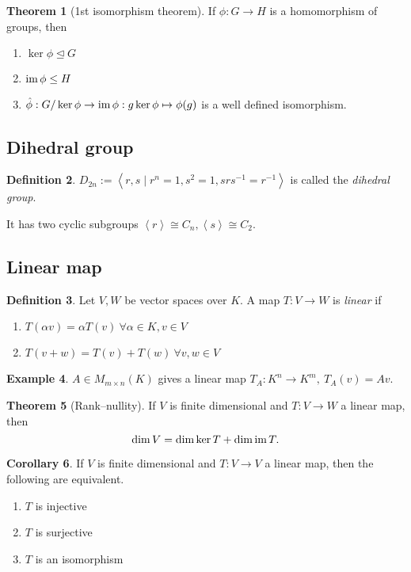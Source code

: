 \documentclass[a4paper]{article}
\newcommand{\la}{\left\langle}
\newcommand{\ra}{\right\rangle}
\newcommand{\im}{\text{im\,}}
\theoremstyle{definition}
\newtheorem{defn}{Definition}[subsection]
\newtheorem{thm}[defn]{Theorem}
\newtheorem{coro}[defn]{Corollary}
\newtheorem{example}[defn]{Example}
\begin{document}
\begin{thm}[1st isomorphism theorem]
If $\phi:G\rightarrow H$ is a homomorphism of groups, then
\begin{enumerate}
\item $\ker\phi\unlhd G$
\item $\im\phi\leq H$
\item $\hat\phi:G/\ker\phi\rightarrow\im\phi:g\ker\phi\mapsto\phi(g)$ is a well defined isomorphism.
\end{enumerate}
\end{thm}

\subsection{Dihedral group}
\begin{defn}
$D_{2n}:=\la r,s\mid r^n=1,s^2=1,srs^{-1}=r^{-1}\ra$ is called the \textit{dihedral group}.

It has two cyclic subgroups $\la r\ra\cong C_n,\la s\ra\cong C_2$.
\end{defn}

\subsection{Linear map}
\begin{defn}
Let $V,W$ be vector spaces over $K$. A map $T:V\rightarrow W$ is \textit{linear} if
\begin{enumerate}
\item $T(\alpha v)=\alpha T(v) \ \forall \alpha\in K,v\in V$
\item $T(v+w)=T(v)+T(w) \ \forall v,w\in V$
\end{enumerate}
\end{defn}

\begin{example}
$A\in M_{m\times n}(K)$ gives a linear map $T_A:K^n\rightarrow K^m,\ T_A(v)=Av$.
\end{example}

\begin{thm}[Rank–nullity]
\label{thm:rank-nullity}
If $V$ is finite dimensional and $T:V\rightarrow W$ a linear map, then
\[
\dim V=\dim\ker T+\dim\im T.
\]
\end{thm}

\begin{coro}
\label{coro:injequivsurjlinmapoverfindimV}
If $V$ is finite dimensional and $T:V\rightarrow V$ a linear map, then the following are equivalent.
\begin{enumerate}
\item $T$ is injective
\item $T$ is surjective
\item $T$ is an isomorphism
\end{enumerate}
\end{coro}
\end{document}
